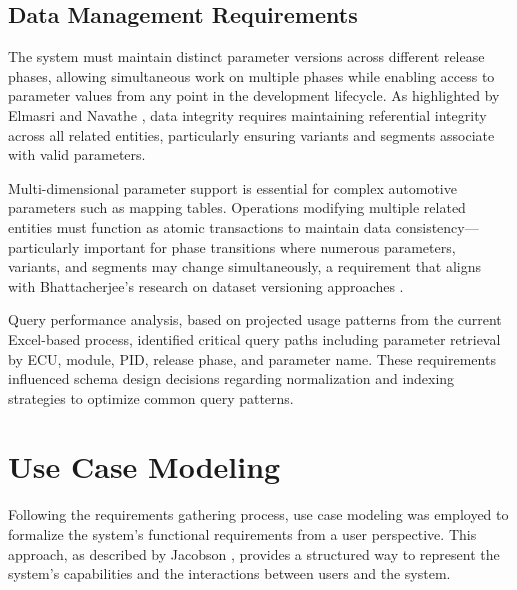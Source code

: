 \subsection{Data Management Requirements}
\label{subsec:data-management-requirements}

The system must maintain distinct parameter versions across different release phases, allowing simultaneous work on multiple phases while enabling access to parameter values from any point in the development lifecycle. As highlighted by Elmasri and Navathe \cite{elmasri2015fundamentals}, data integrity requires maintaining referential integrity across all related entities, particularly ensuring variants and segments associate with valid parameters.

Multi-dimensional parameter support is essential for complex automotive parameters such as mapping tables. Operations modifying multiple related entities must function as atomic transactions to maintain data consistency—particularly important for phase transitions where numerous parameters, variants, and segments may change simultaneously, a requirement that aligns with Bhattacherjee's research on dataset versioning approaches \cite{bhattacherjee2015principles}.

Query performance analysis, based on projected usage patterns from the current Excel-based process, identified critical query paths including parameter retrieval by ECU, module, PID, release phase, and parameter name. These requirements influenced schema design decisions regarding normalization and indexing strategies to optimize common query patterns.

\section{Use Case Modeling}
\label{sec:use-case-modeling}

Following the requirements gathering process, use case modeling was employed to formalize the system's functional requirements from a user perspective. This approach, as described by Jacobson \cite{jacobson2004use}, provides a structured way to represent the system's capabilities and the interactions between users and the system.

